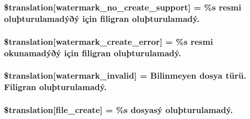 \subsubsection[{\$translation}]{\setlength{\rightskip}{0pt plus 5cm}\$translation\mbox{[}\textquotesingle{}watermark\+\_\+no\+\_\+create\+\_\+support\textquotesingle{}\mbox{]} = \textquotesingle{}\%s resmi oluþturulamadýðý için filigran oluþturulamadý.\textquotesingle{}}\label{class_8upload_8tr___t_r_8php_a82d5853430ab72dc1f9799ec36144cc6}
\hypertarget{class_8upload_8tr___t_r_8php_aabca0b65dadbc6184415c16375f284ca}{}
\subsubsection[{\$translation}]{\setlength{\rightskip}{0pt plus 5cm}\$translation\mbox{[}\textquotesingle{}watermark\+\_\+create\+\_\+error\textquotesingle{}\mbox{]} = \textquotesingle{}\%s resmi okunamadýðý için filigran oluþturulamadý.\textquotesingle{}}\label{class_8upload_8tr___t_r_8php_aabca0b65dadbc6184415c16375f284ca}
\hypertarget{class_8upload_8tr___t_r_8php_ac336e7a5701e47ba4a05e9e498a3cc44}{}
\subsubsection[{\$translation}]{\setlength{\rightskip}{0pt plus 5cm}\$translation\mbox{[}\textquotesingle{}watermark\+\_\+invalid\textquotesingle{}\mbox{]} = \textquotesingle{}Bilinmeyen dosya türü. Filigran oluþturulamadý.\textquotesingle{}}\label{class_8upload_8tr___t_r_8php_ac336e7a5701e47ba4a05e9e498a3cc44}
\hypertarget{class_8upload_8tr___t_r_8php_a1ecb4673e4fb69e06b3f20b65cecf30a}{}
\subsubsection[{\$translation}]{\setlength{\rightskip}{0pt plus 5cm}\$translation\mbox{[}\textquotesingle{}file\+\_\+create\textquotesingle{}\mbox{]} = \textquotesingle{}\%s dosyasý oluþturulamadý.\textquotesingle{}}\label{class_8upload_8tr___t_r_8php_a1ecb4673e4fb69e06b3f20b65cecf30a}
\hypertarget{class_8upload_8tr___t_r_8php_a4712d7ec28e9a7f17eb3338af2358363}{}
